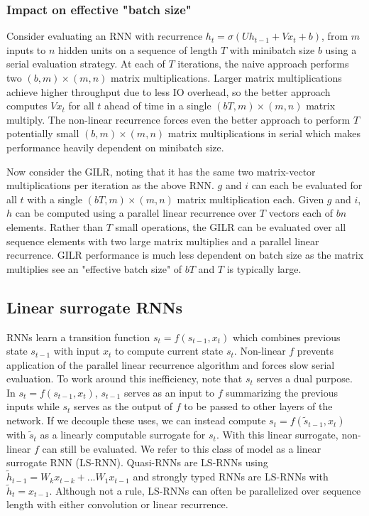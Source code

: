 \documentclass{article}
\begin{document}
\subsubsection{Impact on effective "batch size"}
Consider evaluating an RNN with recurrence $h_t = \sigma(Uh_{t-1} + Vx_t + b)$,
from $m$ inputs to $n$ hidden units on a sequence of length $T$ with minibatch
size $b$ using a serial evaluation strategy. At each of $T$ iterations, the
naive approach performs two $(b, m) \times (m, n)$ matrix
multiplications. Larger matrix multiplications achieve higher throughput due to
less IO overhead, so the better approach computes $Vx_t$ for all $t$ ahead of
time in a single $(bT, m) \times (m, n)$ matrix multiply. The non-linear
recurrence forces even the better approach to perform $T$ potentially small $(b,
m) \times (m, n)$ matrix multiplications in serial which makes performance
heavily dependent on minibatch size.

Now consider the GILR, noting that it has the same two matrix-vector
multiplications per iteration as the above RNN. $g$ and $i$ can each be
evaluated for all $t$ with a single $(bT, m) \times (m, n)$ matrix
multiplication each. Given $g$ and $i$, $h$ can be computed using a parallel
linear recurrence over $T$ vectors each of $bn$ elements. Rather than $T$ small
operations, the GILR can be evaluated over all sequence elements with two large
matrix multiplies and a parallel linear recurrence. GILR performance is much
less dependent on batch size as the matrix multiplies see an "effective batch
size" of $bT$ and $T$ is typically large.

\subsection{Linear surrogate RNNs}
\label{sec:ls-rnns}
RNNs learn a transition function $s_t = f(s_{t-1}, x_t)$ which combines previous
state $s_{t-1}$ with input $x_t$ to compute current state $s_t$. Non-linear $f$
prevents application of the parallel linear recurrence algorithm and forces slow
serial evaluation. To work around this inefficiency, note that $s_t$ serves a
dual purpose. In $s_t = f(s_{t-1}, x_t)$, $s_{t-1}$ serves as an input to $f$
summarizing the previous inputs while $s_t$ serves as the output of $f$ to be
passed to other layers of the network. If we decouple these uses, we can instead
compute $s_t = f(\tilde{s}_{t-1}, x_t)$ with $\tilde{s}_t$ as a linearly
computable surrogate for $s_t$. With this linear surrogate, non-linear $f$ can
still be evaluated. We refer to this class of model as a linear surrogate RNN
(LS-RNN). Quasi-RNNs \cite{bradbury2017quasi} are LS-RNNs using $\tilde{h}_{t-1}
= W_k x_{t-k} + ... W_1 x_{t-1}$ and strongly typed
RNNs\cite{balduzzi2016strongly} are LS-RNNs with $\tilde{h}_t=x_{t-1}$. Although
not a rule, LS-RNNs can often be parallelized over sequence length with either
convolution or linear recurrence.
\end{document}
